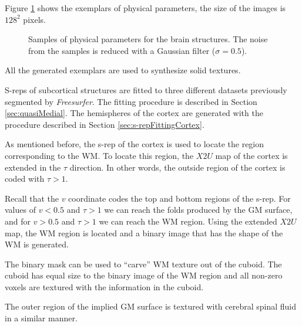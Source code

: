 Figure \ref{fig:physicalParamsSamples} shows the exemplars of physical parameters, the size of the images is $128^2$ pixels.
\begin{figure} 
 \centering   
 \caption[Image samples of physical parameters]{Samples of physical parameters for the brain structures. The noise from the samples is reduced with a Gaussian filter ($\sigma = 0.5$).}
 \label{fig:physicalParamsSamples}  
\end{figure}
All the generated exemplars are used to synthesize solid textures.

S-reps of subcortical structures are fitted to three different datasets previously segmented by \textit{Freesurfer}.
The fitting procedure is described in Section \ref{sec:quasiMedial}.
The hemispheres of the cortex are generated with the procedure described in 
Section \ref{sec:s-repFittingCortex}.

As mentioned before, the s-rep of the cortex 
is used to locate the region corresponding to the WM. 
To locate this region, the $X2U$ map of the cortex 
is extended in the $\tau$ direction. In other words, the outside region of the 
cortex is coded with $\tau > 1$. 

Recall that the $v$ coordinate codes the top and bottom regions of the s-rep.
For values of $v < 0.5$ and $\tau > 1$ we can reach the folds produced by the GM surface, 
and for $v > 0.5$ and $\tau > 1$ we can reach the WM region.
Using the extended $X2U$ map, the WM region is located and a binary image that has the shape of the WM
is generated.

The binary mask can be used to ``carve'' WM texture out of the cuboid. 
The cuboid has equal size to the binary image of the WM region
and all non-zero voxels are textured with the information in the cuboid.

The outer region of the implied GM surface is textured with cerebral spinal fluid in a similar manner.

